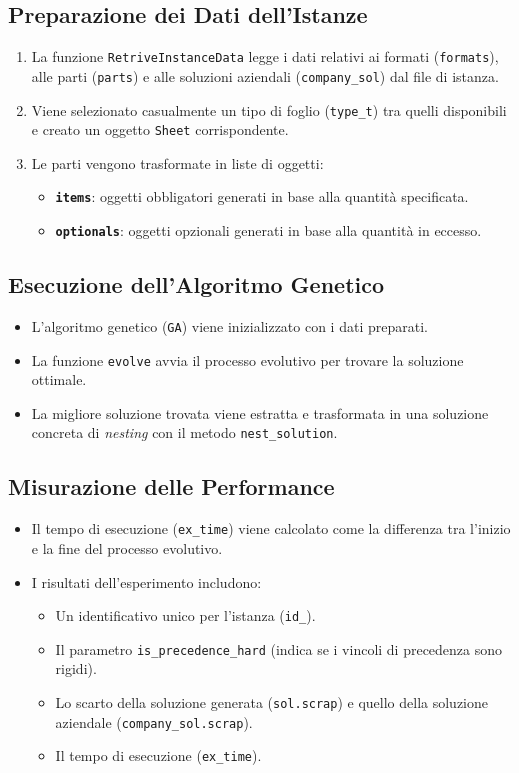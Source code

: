 \subsection{Preparazione dei Dati dell'Istanze}
\begin{enumerate}
    \item La funzione \texttt{RetriveInstanceData} legge i dati relativi ai formati (\texttt{formats}), alle parti (\texttt{parts}) e alle soluzioni aziendali (\texttt{company\_sol}) dal file di istanza.
    \item Viene selezionato casualmente un tipo di foglio (\texttt{type\_t}) tra quelli disponibili e creato un oggetto \texttt{Sheet} corrispondente.
    \item Le parti vengono trasformate in liste di oggetti:
    \begin{itemize}
        \item \textbf{\texttt{items}}: oggetti obbligatori generati in base alla quantità specificata.
        \item \textbf{\texttt{optionals}}: oggetti opzionali generati in base alla quantità in eccesso.
    \end{itemize}
\end{enumerate}

\subsection{Esecuzione dell'Algoritmo Genetico}
\begin{itemize}
    \item L'algoritmo genetico (\texttt{GA}) viene inizializzato con i dati preparati.
    \item La funzione \texttt{evolve} avvia il processo evolutivo per trovare la soluzione ottimale.
    \item La migliore soluzione trovata viene estratta e trasformata in una soluzione concreta di \emph{nesting} con il metodo \texttt{nest\_solution}.
\end{itemize}

\subsection{Misurazione delle Performance}
\begin{itemize}
    \item Il tempo di esecuzione (\texttt{ex\_time}) viene calcolato come la differenza tra l'inizio e la fine del processo evolutivo.
    \item I risultati dell'esperimento includono:
    \begin{itemize}
        \item Un identificativo unico per l'istanza (\texttt{id\_}).
        \item Il parametro \texttt{is\_precedence\_hard} (indica se i vincoli di precedenza sono rigidi).
        \item Lo scarto della soluzione generata (\texttt{sol.scrap}) e quello della soluzione aziendale (\texttt{company\_sol.scrap}).
        \item Il tempo di esecuzione (\texttt{ex\_time}).
    \end{itemize}
\end{itemize}

